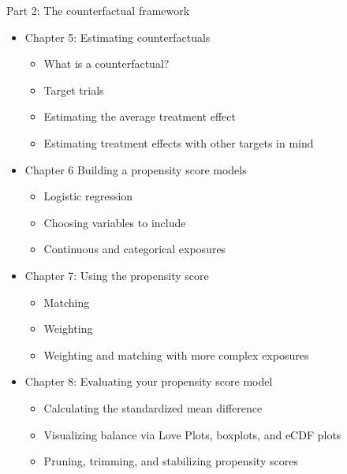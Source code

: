 \documentclass[
]{krantz}
\providecommand{\tightlist}{%
  \setlength{\itemsep}{0pt}\setlength{\parskip}{0pt}}
\begin{document}
Part 2: The counterfactual framework

\begin{itemize}
\tightlist
\item
  Chapter 5: Estimating counterfactuals

  \begin{itemize}
  \tightlist
  \item
    What is a counterfactual?\\
  \item
    Target trials\\
  \item
    Estimating the average treatment effect\\
  \item
    Estimating treatment effects with other targets in mind
  \end{itemize}
\item
  Chapter 6 Building a propensity score models

  \begin{itemize}
  \tightlist
  \item
    Logistic regression\\
  \item
    Choosing variables to include\\
  \item
    Continuous and categorical exposures
  \end{itemize}
\item
  Chapter 7: Using the propensity score

  \begin{itemize}
  \tightlist
  \item
    Matching\\
  \item
    Weighting\\
  \item
    Weighting and matching with more complex exposures
  \end{itemize}
\item
  Chapter 8: Evaluating your propensity score model

  \begin{itemize}
  \tightlist
  \item
    Calculating the standardized mean difference\\
  \item
    Visualizing balance via Love Plots, boxplots, and eCDF plots\\
  \item
    Pruning, trimming, and stabilizing propensity scores
  \end{itemize}
\end{itemize}
\end{document}
